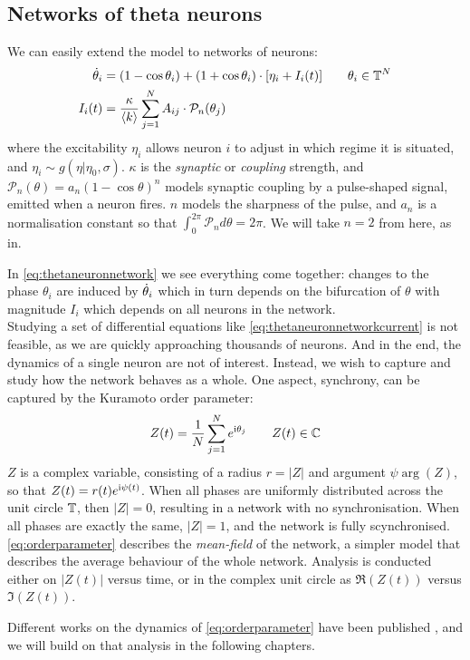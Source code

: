 \subsection{Networks of theta neurons}
We can easily extend the model to networks of neurons:
\begin{align}
\dot{\theta}_{i} &=\left(1-\cos \theta_{i}\right)+\left(1+\cos \theta_{i}\right) \cdot \left[\eta_{i} + I_{i}(t)\right] \qquad \theta_i \in \T^N  \label{eq:thetaneuronnetwork} \\
I_{i}(t) &=\frac{\kappa}{\kmean} \sum_{j=1}^{N} A_{i j} \cdot \mathcal{P}_{n}(\theta_{j}) \label{eq:thetaneuronnetworkcurrent}
\end{align}
where the excitability $\eta_i$ allows neuron $i$ to adjust in which regime it is situated, and $\eta_i \sim g(\eta \rvert \eta_0, \sigma)$. $\kappa$ is the \textsl{synaptic} or \textsl{coupling} strength, and $\mathcal{P}_n(\theta)  = a_n(1 - \cos \theta)^n$ models synaptic coupling by a pulse-shaped signal, emitted when a neuron fires. $n$ models the sharpness of the pulse, and $a_n$ is a normalisation constant so that $\int_{0}^{2 \pi} \mathcal{P}_{n} d \theta=2 \pi$. We will take $n=2$ from here, as in\cite{Luke2013, OttAntonsen2017, Martens2020}. 

In \eqref{eq:thetaneuronnetwork} we see everything come together: changes to the phase $\theta_i$ are induced by ${\dot{\theta}}_i$ which in turn depends on the bifurcation of $\theta$ with magnitude $I_i$ which depends on all neurons in the network. \\

Studying a set of differential equations like \eqref{eq:thetaneuronnetworkcurrent} is not feasible, as we are quickly approaching thousands of neurons. And in the end, the dynamics of a single neuron are not of interest. Instead, we wish to capture and study how the network behaves as a whole. One aspect, synchrony, can be captured by the Kuramoto order parameter:
\begin{align}
Z(t) = \frac{1}{N} \sum_{j=1}^N e^{{\rm{i}}\theta_j}  \qquad Z(t) \in {\mathbb{C}} \label{eq:orderparameter}
\end{align}
$Z$ is a complex variable, consisting of a radius $r = \rvert Z \rvert$ and argument $\psi \arg \left( Z \right)$, so that $Z(t) = r(t) e^{{\rm{i}} \psi(t)}$. When all phases are uniformly distributed across the unit circle ${\mathbb{T}}$, then $\rvert Z \rvert = 0$, resulting in a network with no synchronisation. When all phases are exactly the same, $\rvert Z \rvert = 1$, and the network is fully scynchronised. \eqref{eq:orderparameter} describes the \textsl{mean-field} of the network, a simpler model that describes the average behaviour of the whole network. Analysis is conducted either on $ \rvert Z(t) \rvert$ versus time, or in the complex unit circle as $\Re (Z(t))$ versus $\Im (Z(t))$.

Different works on the dynamics of \eqref{eq:orderparameter} have been published \cite{Luke2013, Martens2020}, and we will build on that analysis in the following chapters.

